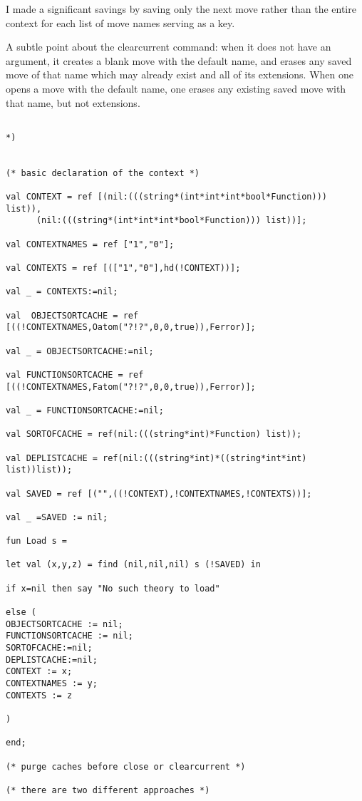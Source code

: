 \documentclass[12pt]{article}
\begin{document}
I made a significant savings by saving only the next move rather than the entire context for each list of move names serving as a key.

A subtle point about the clearcurrent command:  when it does not have an argument, it creates a blank move with the default name, and erases any saved  move of that name
which may already exist and all of its extensions.  When one opens a move with the default name, one erases any existing saved move with that name, but not extensions.

\newpage

\begin{verbatim}

*)


(* basic declaration of the context *)

val CONTEXT = ref [(nil:(((string*(int*int*int*bool*Function))) list)),
      (nil:(((string*(int*int*int*bool*Function))) list))];

val CONTEXTNAMES = ref ["1","0"];

val CONTEXTS = ref [(["1","0"],hd(!CONTEXT))];

val _ = CONTEXTS:=nil;

val  OBJECTSORTCACHE = ref [((!CONTEXTNAMES,Oatom("?!?",0,0,true)),Ferror)];

val _ = OBJECTSORTCACHE:=nil;

val FUNCTIONSORTCACHE = ref [((!CONTEXTNAMES,Fatom("?!?",0,0,true)),Ferror)];

val _ = FUNCTIONSORTCACHE:=nil;

val SORTOFCACHE = ref(nil:(((string*int)*Function) list));

val DEPLISTCACHE = ref(nil:(((string*int)*((string*int*int) list))list));

val SAVED = ref [("",((!CONTEXT),!CONTEXTNAMES,!CONTEXTS))];

val _ =SAVED := nil;

fun Load s = 

let val (x,y,z) = find (nil,nil,nil) s (!SAVED) in

if x=nil then say "No such theory to load"

else (
OBJECTSORTCACHE := nil;
FUNCTIONSORTCACHE := nil;
SORTOFCACHE:=nil;
DEPLISTCACHE:=nil;
CONTEXT := x;
CONTEXTNAMES := y;
CONTEXTS := z

)

end;

(* purge caches before close or clearcurrent *)

(* there are two different approaches *)


\end{verbatim}
\end{document}
